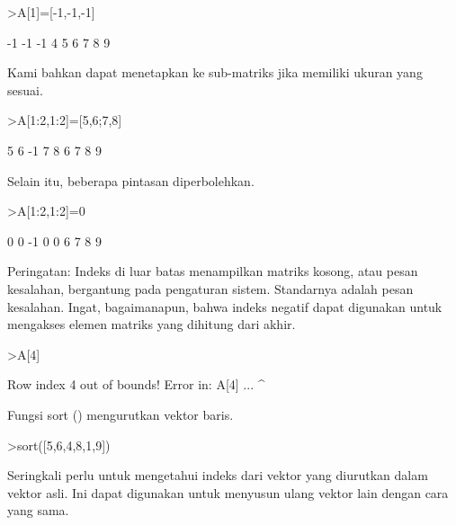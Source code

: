 \documentclass[a4paper,10pt]{article}
\begin{document}
\begin{eulernotebook}
\begin{eulercomment}
\begin{eulercomment}
\begin{eulercomment}
\begin{eulercomment}
\begin{eulercomment}
\begin{eulercomment}
\begin{eulercomment}
\end{eulercomment}
\begin{eulerprompt}
>A[1]=[-1,-1,-1]
\end{eulerprompt}
\begin{euleroutput}
             -1            -1            -1 
              4             5             6 
              7             8             9 
\end{euleroutput}
\begin{eulercomment}
Kami bahkan dapat menetapkan ke sub-matriks jika memiliki ukuran yang
sesuai.
\end{eulercomment}
\begin{eulerprompt}
>A[1:2,1:2]=[5,6;7,8]
\end{eulerprompt}
\begin{euleroutput}
              5             6            -1 
              7             8             6 
              7             8             9 
\end{euleroutput}
\begin{eulercomment}
Selain itu, beberapa pintasan diperbolehkan.
\end{eulercomment}
\begin{eulerprompt}
>A[1:2,1:2]=0
\end{eulerprompt}
\begin{euleroutput}
              0             0            -1 
              0             0             6 
              7             8             9 
\end{euleroutput}
\begin{eulercomment}
Peringatan: Indeks di luar batas menampilkan matriks kosong, atau
pesan kesalahan, bergantung pada pengaturan sistem. Standarnya adalah
pesan kesalahan. Ingat, bagaimanapun, bahwa indeks negatif dapat
digunakan untuk mengakses elemen matriks yang dihitung dari akhir.
\end{eulercomment}
\begin{eulerprompt}
>A[4]
\end{eulerprompt}
\begin{euleroutput}
  Row index 4 out of bounds!
  Error in:
  A[4] ...
      ^
\end{euleroutput}
\begin{eulercomment}
Fungsi sort () mengurutkan vektor baris.
\end{eulercomment}
\begin{eulerprompt}
>sort([5,6,4,8,1,9])
\end{eulerprompt}
\begin{euleroutput}
  [1,  4,  5,  6,  8,  9]
\end{euleroutput}
\begin{eulercomment}
Seringkali perlu untuk mengetahui indeks dari vektor yang diurutkan
dalam vektor asli. Ini dapat digunakan untuk menyusun ulang vektor
lain dengan cara yang sama.


\end{eulercomment}
\end{eulercomment}
\end{eulercomment}
\end{eulercomment}
\end{eulercomment}
\end{eulercomment}
\end{eulercomment}
\end{eulernotebook}
\end{document}
